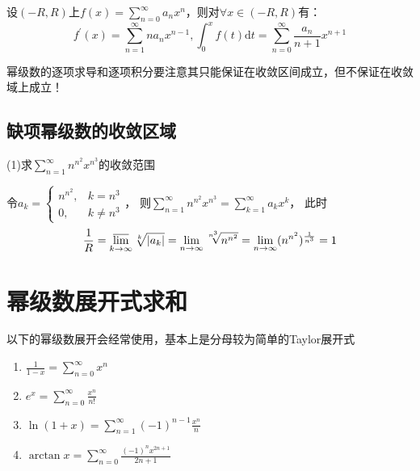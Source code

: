 \begin{theorem}[求导与求积]
  设$(-R,R)$上$f(x) = \sum\limits_{n = 0}^{\infty}a_nx^n$，则对$\forall x \in (-R, R)$有：
  \begin{equation*}
    f^{\prime}(x) = \sum\limits_{n = 1}^{\infty}na_nx^{n-1}, \int_0^x f(t) \mathrm{d} t = \sum\limits_{n = 0}^{\infty}\frac{a_n}{n+1}x^{n+1}
  \end{equation*}
\end{theorem}

\begin{note}
  幂级数的逐项求导和逐项积分要注意其只能保证在收敛区间成立，但不保证在收敛域上成立！
\end{note}

\subsection{缺项幂级数的收敛区域}

\begin{exercise}[缺项幂级数的收敛范围]
  (1)求$\sum\limits_{n = 1}^{\infty}n^{n^2}x^{n^3}$的收敛范围
\end{exercise}

\begin{solution}
  令$a_k =
  \begin{cases}
    n^{n^2}, & k = n^3\\
    0, & k \neq n^3
  \end{cases}
  $，
  则$\sum\limits_{n = 1}^{\infty}n^{n^2}x^{n^3} = \sum\limits_{k = 1}^{\infty}a_kx^k$，
  此时
  \begin{equation*}
    \frac{1}{R} =\varlimsup \limits_{k \rightarrow \infty}\sqrt[k]{|a_k|} =  \lim \limits _{n \rightarrow \infty} \sqrt[n^3]{n^{n^2}} = \lim \limits _{n \rightarrow \infty} (n^{n^2})^{\frac{1}{n^3}} = 1
  \end{equation*}
\end{solution}



\section{幂级数展开式求和}


\begin{theorem}[必备幂级数展开]
  以下的幂级数展开会经常使用，基本上是分母较为简单的Taylor展开式
  \begin{enumerate}
  \item $\frac{1}{1-x} = \sum\limits_{n = 0}^{\infty} x^n$
  \item $e^x = \sum\limits_{n = 0}^{\infty} \frac{x^n}{n!}$
  \item $\ln (1 + x) = \sum\limits_{n = 1}^{\infty} (-1)^{n-1} \frac{x^n}{n}$
  \item $\arctan x = \sum\limits_{n = 0}^{\infty} \frac{(-1)^n x^{2n+1}}{2n+1}$
  \end{enumerate}
\end{theorem}

